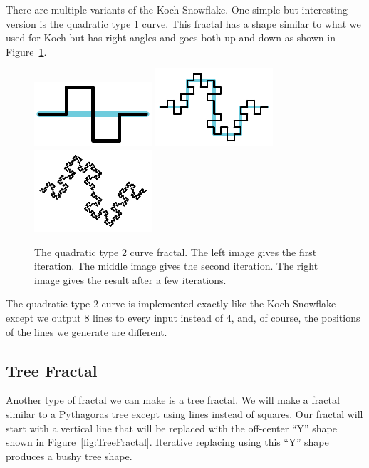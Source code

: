 There are multiple variants of the Koch Snowflake.
One simple but interesting version is the quadratic type 1 curve.
This fractal has a shape similar to what we used for Koch but has right angles and goes both up and down as shown in Figure~\ref{fig:QuadraticType2}.

\begin{figure}[htb]
  \centering
  \includegraphics[scale=2]{images/QuadraticType2_1}
  \hfill
  \includegraphics[scale=2]{images/QuadraticType2_2}
  \hfill
  \includegraphics[scale=2]{images/QuadraticType2_4}
  \caption[The quadratic type 2 curve fractal.]{
    The quadratic type 2 curve fractal.
    The left image gives the first iteration.
    The middle image gives the second iteration.
    The right image gives the result after a few iterations.
  }
  \label{fig:QuadraticType2}
\end{figure}

The quadratic type 2 curve is implemented exactly like the Koch Snowflake except we output 8 lines to every input instead of 4, and, of course, the positions of the lines we generate are different.


\subsection{Tree Fractal}

Another type of fractal we can make is a tree fractal.
We will make a fractal similar to a Pythagoras tree except using lines instead of squares.
Our fractal will start with a vertical line that will be replaced with the off-center ``Y'' shape shown in Figure~\ref{fig:TreeFractal}.
Iterative replacing using this ``Y'' shape produces a bushy tree shape.


